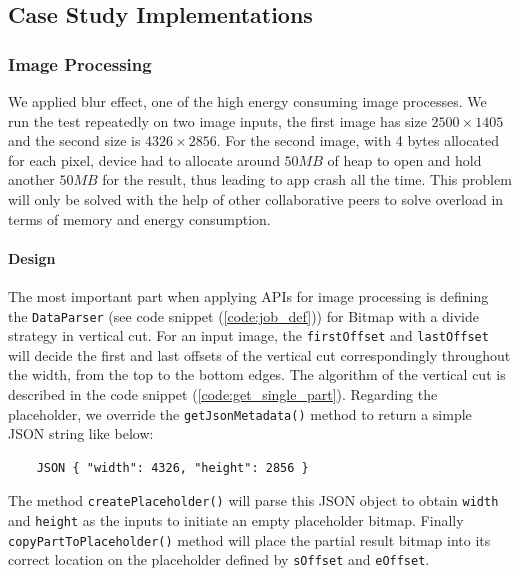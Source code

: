 \documentclass{sig-alternate}[10pt]
\begin{document}
\subsection{Case Study Implementations}

\subsubsection{Image Processing}
We applied blur effect, one of the high energy consuming image processes. We run the test repeatedly on two image inputs, the first image has size $2500 \times 1405$ and the second size is $4326 \times 2856$. For the second image, with 4 bytes allocated for each pixel, device had to allocate around $50MB$ of heap to open and hold another $50MB$ for the result, thus leading to app crash all the time. This problem will only be solved with the help of other collaborative peers to solve overload in terms of memory and energy consumption.

\paragraph{Design}
The most important part when applying APIs for image processing is defining the \texttt{DataParser} (see code snippet (\ref{code:job_def})) for Bitmap with a divide strategy in vertical cut. For an input image, the \texttt{firstOffset} and \texttt{lastOffset} will decide the first and last offsets of the vertical cut correspondingly throughout the width, from the top to the bottom edges. The algorithm of the vertical cut is described in the code snippet (\ref{code:get_single_part}). Regarding the placeholder, we override the \texttt{getJsonMetadata()} method to return a simple JSON string like below:

	\begin{lstlisting} 
	JSON { "width": 4326, "height": 2856 } 
	\end{lstlisting}

The method \texttt{createPlaceholder()} will parse this JSON object to obtain \texttt{width} and \texttt{height} as the inputs to initiate an empty placeholder bitmap. Finally \texttt{copyPartToPlaceholder()} method will place the partial result bitmap into its correct location on the placeholder defined by \texttt{sOffset} and \texttt{eOffset}.\\
\end{document}
